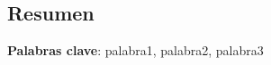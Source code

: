 \noindent \begin{center}
\section*{Resumen}
\par\end{center}

\lipsum[1-2]

\vspace{0.5cm}
\begin{flushleft}
\textbf{Palabras clave}: palabra1, palabra2, palabra3
\end{flushleft}